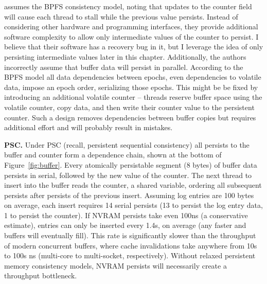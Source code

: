 \cite{FangHsiao11} assumes the BPFS consistency model, noting that updates to the counter field will cause each thread to stall while the previous value persists.
Instead of considering other hardware and programming interfaces, they provide additional software complexity to allow only intermediate values of the counter to persist.
I believe that their software has a recovery bug in it, but I leverage the idea of only persisting intermediate values later in this chapter.
Additionally, the authors incorrectly assume that buffer data will persist in parallel.
According to the BPFS model all data dependencies between epochs, even dependencies to volatile data, impose an epoch order, serializing those epochs.
This might be be fixed by introducing an additional volatile counter -- threads reserve buffer space using the volatile counter, copy data, and then write their counter value to the persistent counter.
Such a design removes dependencies between buffer copies but requires additional effort and will probably result in mistakes.

\textbf{PSC.} Under PSC (recall, persistent sequential consistency) all persists to the buffer and counter form a dependence chain, shown at the bottom of Figure~\ref{fig:buffer}.
Every atomically persistable segment (8 bytes) of buffer data persists in serial, followed by the new value of the counter.
The next thread to insert into the buffer reads the counter, a shared variable, ordering all subsequent persists after persists of the previous insert.
Assuming log entries are 100 bytes on average, each insert requires 14 serial persists (13 to persist the log entry data, 1 to persist the counter).
If NVRAM persists take even 100ns (a conservative estimate), entries can only be inserted every 1.4\textmu s, on average (any faster and buffers will eventually fill).
This rate is significantly slower than the throughput of modern concurrent buffers, where cache invalidations take anywhere from 10s to 100s ns (multi-core to multi-socket, respectively).
Without relaxed persistent memory consistency models, NVRAM persists will necessarily create a throughput bottleneck.

